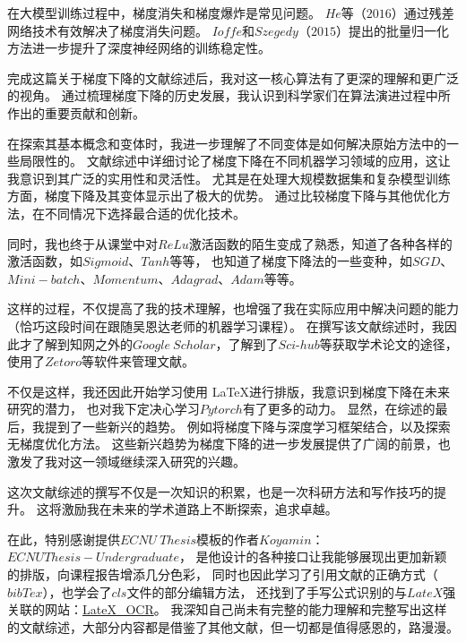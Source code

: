 \documentclass[printMode=false, declarePage=false]{ecnuthesis}
\begin{document}
    在大模型训练过程中，梯度消失和梯度爆炸是常见问题。
    $He$等（$2016$）通过残差网络技术有效解决了梯度消失问题\cite{he2016deep}。
    $Ioffe$和$Szegedy$（$2015$）提出的批量归一化方法进一步提升了深度神经网络的训练稳定性\cite{ioffe2015batch}。

    \backmatter

    \begin{acknowledgement}
        完成这篇关于梯度下降的文献综述后，我对这一核心算法有了更深的理解和更广泛的视角。
        通过梳理梯度下降的历史发展，我认识到科学家们在算法演进过程中所作出的重要贡献和创新。

        在探索其基本概念和变体时，我进一步理解了不同变体是如何解决原始方法中的一些局限性的。
        文献综述中详细讨论了梯度下降在不同机器学习领域的应用，这让我意识到其广泛的实用性和灵活性。
        尤其是在处理大规模数据集和复杂模型训练方面，梯度下降及其变体显示出了极大的优势。
        通过比较梯度下降与其他优化方法，在不同情况下选择最合适的优化技术。

        同时，我也终于从课堂中对$ReLu$激活函数的陌生变成了熟悉，知道了各种各样的激活函数，如$Sigmoid$、$Tanh$等等，
        也知道了梯度下降法的一些变种，如$SGD$、$Mini-batch$、$Momentum$、$Adagrad$、$Adam$等等。

        这样的过程，不仅提高了我的技术理解，也增强了我在实际应用中解决问题的能力（恰巧这段时间在跟随吴恩达老师的机器学习课程）。
        在撰写该文献综述时，我因此才了解到知网之外的$Google\ Scholar$，了解到了$Sci$-$hub$等获取学术论文的途径，使用了$Zetoro$等软件来管理文献。

        不仅是这样，我还因此开始学习使用 \LaTeX 进行排版，我意识到梯度下降在未来研究的潜力，
        也对我下定决心学习$Pytorch$有了更多的动力。
        显然，在综述的最后，我提到了一些新兴的趋势。
        例如将梯度下降与深度学习框架结合，以及探索无梯度优化方法。
        这些新兴趋势为梯度下降的进一步发展提供了广阔的前景，也激发了我对这一领域继续深入研究的兴趣。

        这次文献综述的撰写不仅是一次知识的积累，也是一次科研方法和写作技巧的提升。
        这将激励我在未来的学术道路上不断探索，追求卓越。

        在此，特别感谢提供$ECNU\ Thesis$模板的作者$Koyamin$：
        \href{https://github.com/Koyamin/ECNUThesis-Undergraduate}{$ECNUThesis-Undergraduate$}，
        是他设计的各种接口让我能够展现出更加新颖的排版，向课程报告增添几分色彩，
        同时也因此学习了引用文献的正确方式（$bibTex$），也学会了$cls$文件的部分编辑方法，
        还找到了手写公式识别的与$LateX$强关联的网站：\href{https://simpletex.cn/ai/latex_ocr}{LateX\_OCR}。
        我深知自己尚未有完整的能力理解和完整写出这样的文献综述，大部分内容都是借鉴了其他文献，但一切都是值得感恩的，路漫漫。

    \end{acknowledgement}
\end{document}
